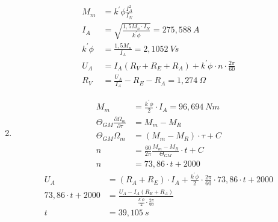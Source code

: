 \begin{solution}
\begin{enumerate}
\begin{align}
	M_m &= k^{'} \phi \frac{I_A^2}{I_N}\\
	I_A &= \sqrt{\frac{1,5 M_n \cdot I_N}{k^{'} \phi}} = 275,588~A\\
	k^{'} \phi &= \frac{1,5 M_n}{I_A} = 2,1052~Vs\\
	U_A &= I_A (R_V +R_E +R_A) + k^{'} \phi \cdot n \cdot \frac{2 \pi}{60}\\
	R_V&= \frac{U_A}{I_A} -R_E -R_A= 1,274~\Omega
\end{align}
\item 
\begin{align}
	M_m &= \frac{k^{'} \phi}{2} \cdot I_A = 96,694~Nm\\
	\Theta_{GM} \frac{\partial \Omega_m}{\partial \tau} &= M_m -M_R\\
	\Theta_{GM} \Omega_m &= (M_m -M_R)\cdot \tau + C\\
	n&= \frac{60}{2\pi} \frac{M_m -M_R}{\Theta_{GM}}\cdot t + C\\
	n&= 73,86 \cdot t + 2000
\end{align}
\begin{align}
	U_A &= (R_A +R_E) \cdot I_A + \frac{k^{'} \phi}{2} \cdot \frac{2 \pi}{60}\cdot 73,86 \cdot t + 2000\\
	73,86\cdot t + 2000 &= \frac{U_A -I_A (R_E + R_A)}{\frac{k^{'} \phi}{2} \cdot \frac{2 \pi}{60}}\\
	t &= 39,105~s
\end{align}
\end{enumerate}
\end{solution}
